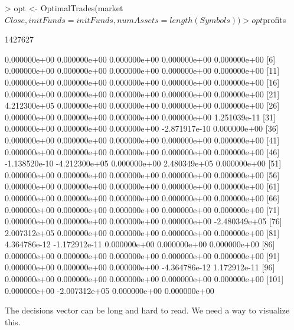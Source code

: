 \documentclass{article}
\begin{document}
\begin{Schunk}
\begin{Sinput}
> opt <- OptimalTrades(market$Close, initFunds = initFunds, numAssets = length(Symbols))
> opt$profits
\end{Sinput}
\begin{Soutput}
[1] 1427627
\end{Soutput}
\begin{Soutput}
  [1]  0.000000e+00  0.000000e+00  0.000000e+00  0.000000e+00  0.000000e+00
  [6]  0.000000e+00  0.000000e+00  0.000000e+00  0.000000e+00  0.000000e+00
 [11]  0.000000e+00  0.000000e+00  0.000000e+00  0.000000e+00  0.000000e+00
 [16]  0.000000e+00  0.000000e+00  0.000000e+00  0.000000e+00  0.000000e+00
 [21]  4.212300e+05  0.000000e+00  0.000000e+00  0.000000e+00  0.000000e+00
 [26]  0.000000e+00  0.000000e+00  0.000000e+00  0.000000e+00  1.251039e-11
 [31]  0.000000e+00  0.000000e+00  0.000000e+00 -2.871917e-10  0.000000e+00
 [36]  0.000000e+00  0.000000e+00  0.000000e+00  0.000000e+00  0.000000e+00
 [41]  0.000000e+00  0.000000e+00  0.000000e+00  0.000000e+00  0.000000e+00
 [46] -1.138520e-10 -4.212300e+05  0.000000e+00  2.480349e+05  0.000000e+00
 [51]  0.000000e+00  0.000000e+00  0.000000e+00  0.000000e+00  0.000000e+00
 [56]  0.000000e+00  0.000000e+00  0.000000e+00  0.000000e+00  0.000000e+00
 [61]  0.000000e+00  0.000000e+00  0.000000e+00  0.000000e+00  0.000000e+00
 [66]  0.000000e+00  0.000000e+00  0.000000e+00  0.000000e+00  0.000000e+00
 [71]  0.000000e+00  0.000000e+00  0.000000e+00  0.000000e+00 -2.480349e+05
 [76]  2.007312e+05  0.000000e+00  0.000000e+00  0.000000e+00  0.000000e+00
 [81]  4.364786e-12 -1.172912e-11  0.000000e+00  0.000000e+00  0.000000e+00
 [86]  0.000000e+00  0.000000e+00  0.000000e+00  0.000000e+00  0.000000e+00
 [91]  0.000000e+00  0.000000e+00  0.000000e+00 -4.364786e-12  1.172912e-11
 [96]  0.000000e+00  0.000000e+00  0.000000e+00  0.000000e+00  0.000000e+00
[101]  0.000000e+00 -2.007312e+05  0.000000e+00  0.000000e+00
\end{Soutput}
\end{Schunk}

The decisions vector can be long and hard to read.  We need a way to visualize this.
\end{document}
